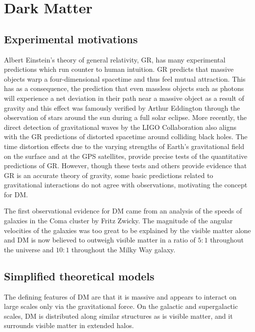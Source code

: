 \section{Dark Matter}
 \subsection{Experimental motivations}
  
 Albert Einstein's theory of general relativity, GR,
  has many experimental predictions which 
  run counter to human intuition.
 GR predicts that massive objects
  warp a four-dimensional spacetime and
  thus feel mutual attraction.
 This has as a consequence,
  the prediction that even massless objects
  such as photons will experience a 
  net deviation in their path
  near a massive object as a result of
  gravity and this effect was famously verified
  by Arthur Eddington
  through the observation of stars around the
  sun during a full solar eclipse. 
 More recently, the direct detection of
  gravitational waves by the LIGO
  Collaboration also aligns with the GR
  predictions of distorted spacetime
  around colliding black holes.
 The time distortion effects due to
  the varying strengths of Earth's gravitational
  field on the surface and at the GPS satellites,
  provide precise tests of the quantitative 
  predictions of GR.
 However, though these tests and others provide evidence that
  GR is an accurate theory of gravity,
  some basic predictions related to gravitational interactions 
  do not agree with observations,
  motivating the concept for DM.
  
 The first observational evidence for DM
  came from an analysis of the speeds of galaxies
  in the Coma cluster by Fritz Zwicky.
 The magnitude of the angular velocities of the
  galaxies was too great to be explained by the visible matter
  alone and DM is now believed to outweigh visible
  matter in a ratio of $5:1$ throughout the universe
  and $10:1$ throughout the Milky Way galaxy. 

%

  \subsection{Simplified theoretical models} 

  The defining features of DM are that
   it is massive and appears to interact
   on large scales only via the gravitational force.
  On the galactic and supergalactic scales,
   DM is distributed along similar structures
   as is visible matter, and it surrounds 
   visible matter in extended halos. 

